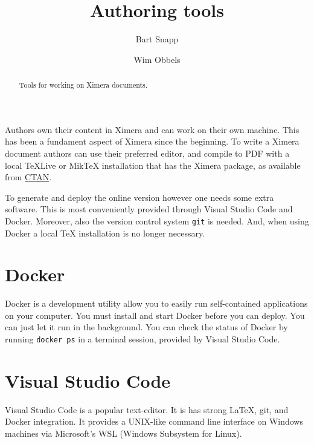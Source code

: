\documentclass{ximera}
\title{Authoring tools}
\author{Bart Snapp \and Wim Obbels}
\begin{document}
\begin{abstract}
      Tools for working on Ximera documents.
\end{abstract}
\maketitle

Authors own their content in Ximera and can work on their own machine. This has
been a fundament aspect of Ximera since the beginning. 
To write a Ximera document authors can use their preferred editor, and compile to PDF 
with a local TeXLive or MikTeX installation that has the Ximera package, 
as available from \href{https://ctan.org/pkg/ximera}{CTAN}.

To generate and deploy the online version however one needs some extra software. 
This is most conveniently provided through Visual Studio Code and Docker.
Moreover, also the version control system \verb!git! is needed.
And, when using Docker a local TeX installation is no longer necessary.


\section{Docker}

Docker is a development utility allow you to easily run self-contained applications on your
computer. You must install and start Docker before you can deploy. You can just let
it run in the background. You can check the status of Docker by running
\verb!docker ps! in a terminal session, provided by Visual Studio Code.

\section{Visual Studio Code}

Visual Studio Code
is a popular text-editor. It is has strong \LaTeX, git,
and Docker integration. It provides a UNIX-like command line interface on
Windows machines via Microsoft's WSL (Windows Subsystem for Linux).
\end{document}
